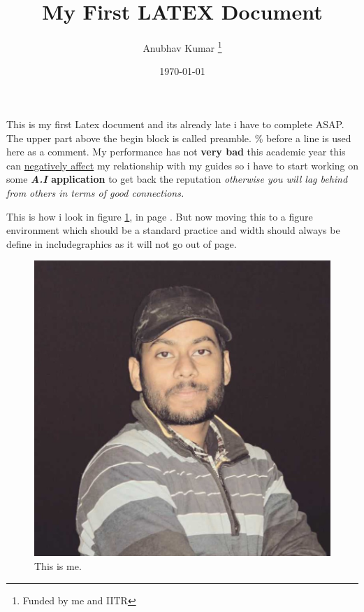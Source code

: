 \documentclass[12pt, letterpaper]{article}
\title{My First LATEX Document}
\author{Anubhav Kumar \thanks{Funded by me and IITR}}
\date{\today}
\begin{document}
\maketitle

This is my first Latex document and its already late i have to complete ASAP.
The upper part above the begin block is called preamble.
\% before a line is used here as a comment.
My performance has not \textbf{very bad} this academic year this can \underline{negatively affect} my relationship with my guides so i have to start working on some \textbf{\emph{A.I} application} to get back the reputation \textit{otherwise you will \emph{lag} behind from others in terms of good connections.}

This is how i look in figure \ref{fig:my_label}, in page \pageref{fig:my_label}. 
But now moving this to a figure environment which should be a standard practice and width should always be define in includegraphics as it will not go out of page.

\begin{figure}[h]
    \centering
    \includegraphics[width=0.5 \textwidth]{anubhav}
    \caption{This is me.}
    \label{fig:my_label}
\end{figure}
\end{document}

